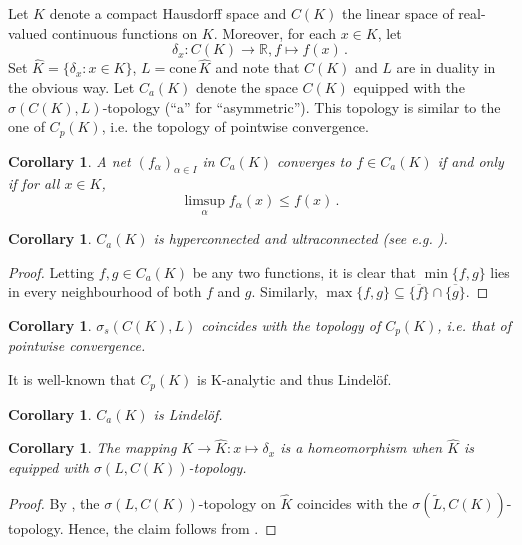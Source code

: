 \documentclass[
	paper=A4,
	pagesize=auto,
	fontsize=12pt
]{scrartcl}
\theoremstyle{plain}
\newtheorem{corollary}[theorem]{Corollary}
\theoremstyle{remark}
\theoremstyle{definition}
\begin{document}
Let $K$ denote a compact Hausdorff space and $C(K)$ the linear space of real-valued continuous functions on $K$.
Moreover, for each $x \in K$, let
%
\begin{equation}
\delta_x : C(K) \to \mathbb{R}, f \mapsto f \left( x \right) \, .
\end{equation}
%
Set $\widehat{K} = \{ \delta_x : x \in K \}$, $L = \mathrm{cone}\, \widehat{K}$ and note that $C(K)$ and $L$ are in duality in the obvious way.
Let $C_a(K)$ denote the space $C(K)$ equipped with the $\sigma(C(K), L)$-topology (\enquote{a} for \enquote{asymmetric}).
This topology is similar to the one of $C_p(K)$, i.e. the topology of pointwise convergence.
%
\begin{corollary}
\label{cor:CaKConvergence}
A net $(f_\alpha)_{\alpha \in I}$ in $C_a(K)$ converges to $f \in C_a(K)$ if and only if for all $x \in K$,
%
\begin{equation}
\limsup_\alpha f_\alpha \left( x \right) \le f \left( x \right) \, .
\end{equation}
\end{corollary}
%
\begin{corollary}
$C_a(K)$ is hyperconnected and ultraconnected (see e.g. \cite[p. 29]{src:SteenSeebach:CounterexamplesInTopology}).
\end{corollary}
\begin{proof}
Letting $f, g \in C_a(K)$ be any two functions, it is clear that $\min\{ f, g \}$ lies in every neighbourhood of both $f$ and $g$.
Similarly, $\max\{ f, g \} \subseteq \overline{\{ f \}} \cap \overline{ \{ g \} }$.
\end{proof}
%
\begin{corollary}
$\sigma_s( C(K), L )$ coincides with the topology of $C_p(K)$, i.e. that of pointwise convergence.
\end{corollary}
%
It is well-known that $C_p(K)$ is K-analytic and thus Lindelöf.
%
\begin{corollary}
$C_a(K)$ is Lindelöf.
\end{corollary}
%
\begin{corollary}
\label{cor:KToKHatHomeomorphism}
The mapping $K \to \widehat{K}: x \mapsto \delta_x$ is a homeomorphism when $\widehat{K}$ is equipped with $\sigma(L, C(K))$-topology.
\end{corollary}
\begin{proof}
By , the $\sigma(L, C(K))$-topology on $\widehat{K}$ coincides with the $\sigma(\widetilde{L}, C(K))$-topology.
Hence, the claim follows from \cite[Lemma 3.55]{src:Fabian:BanachSpaceTheory}.
\end{proof}
\end{document}
